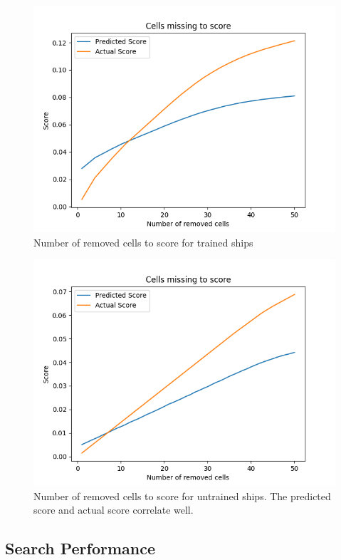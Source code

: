 \documentclass{l4proj}
\begin{document}
 

\begin{figure}[h!]
\centering
\includegraphics[width=0.8\linewidth]{dissertation/images/graphs/cells_missing_to_score_trained.png}
\caption{Number of removed cells to score for trained ships}
\label{fig:subim1}
\end{figure}

\begin{figure}[h!]
\centering
\includegraphics[width=0.8\linewidth]{dissertation/images/graphs/cells_missing_to_score_test.png}
\caption{Number of removed cells to score for untrained ships. The predicted score and actual score correlate well.}
\label{fig:subim1}
\end{figure}

\subsection{Search Performance}
\end{document}
